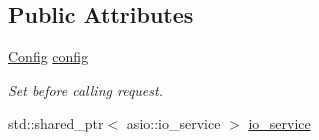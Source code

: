\subsection*{Public Attributes}
\begin{DoxyCompactItemize}
\item 
\hyperlink{classSimpleWeb_1_1ClientBase_1_1Config}{Config} \hyperlink{classSimpleWeb_1_1ClientBase_af17ddd25319c4f9029969441dfd54eff}{config}\hypertarget{classSimpleWeb_1_1ClientBase_af17ddd25319c4f9029969441dfd54eff}{}\label{classSimpleWeb_1_1ClientBase_af17ddd25319c4f9029969441dfd54eff}

\begin{DoxyCompactList}\small\item\em Set before calling request. \end{DoxyCompactList}\item 
std\+::shared\+\_\+ptr$<$ asio\+::io\+\_\+service $>$ \hyperlink{classSimpleWeb_1_1ClientBase_a751ea45ccc44ab9c4afaa0738bd305ea}{io\+\_\+service}
\end{DoxyCompactItemize}
